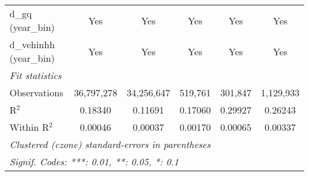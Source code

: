\begin{tabular}{lccccc}
d\_gq (year\_bin) & Yes & Yes & Yes & Yes & Yes\\
d\_vehinhh (year\_bin) & Yes & Yes & Yes & Yes & Yes\\
\midrule \emph{Fit statistics}&  & & & & \\
Observations & 36,797,278&34,256,647&519,761&301,847&1,129,933\\
R$^2$ & 0.18340&0.11691&0.17060&0.29927&0.26243\\
Within R$^2$ & 0.00046&0.00037&0.00170&0.00065&0.00337\\
\midrule\midrule\multicolumn{6}{l}{\emph{Clustered (czone) standard-errors in parentheses}}\\
\multicolumn{6}{l}{\emph{Signif. Codes: ***: 0.01, **: 0.05, *: 0.1}}\\
\end{tabular}


